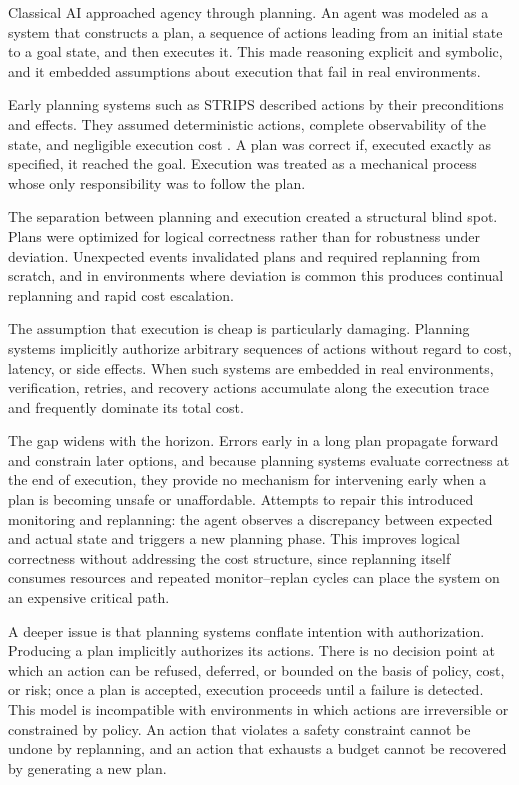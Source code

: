\documentclass[11pt]{book}
\begin{document}
Classical AI approached agency through planning. An agent was modeled as a system that constructs a plan, a sequence of actions leading from an initial state to a goal state, and then executes it. This made reasoning explicit and symbolic, and it embedded assumptions about execution that fail in real environments.

Early planning systems such as STRIPS described actions by their preconditions and effects. They assumed deterministic actions, complete observability of the state, and negligible execution cost \cite{fikes1971strips}. A plan was correct if, executed exactly as specified, it reached the goal. Execution was treated as a mechanical process whose only responsibility was to follow the plan.

The separation between planning and execution created a structural blind spot. Plans were optimized for logical correctness rather than for robustness under deviation. Unexpected events invalidated plans and required replanning from scratch, and in environments where deviation is common this produces continual replanning and rapid cost escalation.

The assumption that execution is cheap is particularly damaging. Planning systems implicitly authorize arbitrary sequences of actions without regard to cost, latency, or side effects. When such systems are embedded in real environments, verification, retries, and recovery actions accumulate along the execution trace and frequently dominate its total cost.

The gap widens with the horizon. Errors early in a long plan propagate forward and constrain later options, and because planning systems evaluate correctness at the end of execution, they provide no mechanism for intervening early when a plan is becoming unsafe or unaffordable. Attempts to repair this introduced monitoring and replanning: the agent observes a discrepancy between expected and actual state and triggers a new planning phase. This improves logical correctness without addressing the cost structure, since replanning itself consumes resources and repeated monitor--replan cycles can place the system on an expensive critical path.

A deeper issue is that planning systems conflate intention with authorization. Producing a plan implicitly authorizes its actions. There is no decision point at which an action can be refused, deferred, or bounded on the basis of policy, cost, or risk; once a plan is accepted, execution proceeds until a failure is detected. This model is incompatible with environments in which actions are irreversible or constrained by policy. An action that violates a safety constraint cannot be undone by replanning, and an action that exhausts a budget cannot be recovered by generating a new plan.
\end{document}
